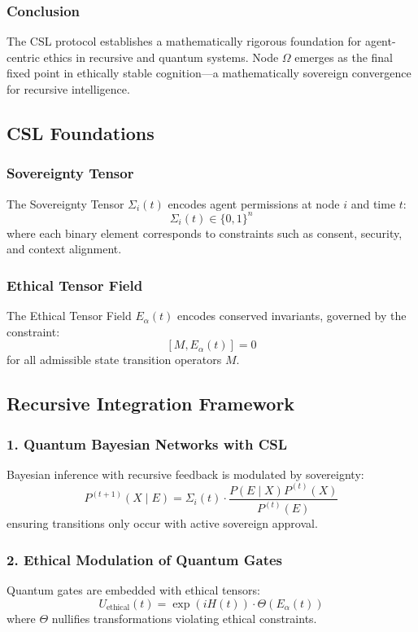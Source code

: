 \documentclass[12pt]{article}
\begin{document}
\subsubsection{Conclusion}
The CSL protocol establishes a mathematically rigorous foundation for agent-centric ethics in recursive and quantum systems. Node $\Omega$ emerges as the final fixed point in ethically stable cognition—a mathematically sovereign convergence for recursive intelligence.


\subsection{CSL Foundations}

\subsubsection*{Sovereignty Tensor}
The Sovereignty Tensor $\Sigma_i(t)$ encodes agent permissions at node $i$ and time $t$:
\[
\Sigma_i(t) \in \{0, 1\}^n
\]
where each binary element corresponds to constraints such as consent, security, and context alignment.

\subsubsection*{Ethical Tensor Field}
The Ethical Tensor Field $E_\alpha(t)$ encodes conserved invariants, governed by the constraint:
\[
[M, E_\alpha(t)] = 0
\]
for all admissible state transition operators $M$.

\subsection{Recursive Integration Framework}

\subsubsection*{1. Quantum Bayesian Networks with CSL}
Bayesian inference with recursive feedback is modulated by sovereignty:
\[
P^{(t+1)}(X \mid E) = \Sigma_i(t) \cdot \frac{P(E \mid X) P^{(t)}(X)}{P^{(t)}(E)}
\]
ensuring transitions only occur with active sovereign approval.

\subsubsection*{2. Ethical Modulation of Quantum Gates}
Quantum gates are embedded with ethical tensors:
\[
U_{\text{ethical}}(t) = \exp(iH(t)) \cdot \Theta(E_\alpha(t))
\]
where $\Theta$ nullifies transformations violating ethical constraints.
\end{document}

